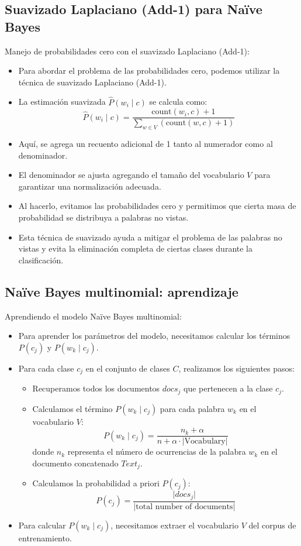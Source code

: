 \subsection{Suavizado Laplaciano (Add-1) para Naïve Bayes}

Manejo de probabilidades cero con el suavizado Laplaciano (Add-1):
\begin{itemize}
    \item Para abordar el problema de las probabilidades cero, podemos utilizar la técnica de suavizado Laplaciano (Add-1).
    \item La estimación suavizada $\hat{P}(w_i \mid c)$ se calcula como:
    \[
    \hat{P}(w_i \mid c) = \frac{\text{count}(w_i, c) + 1}{\sum_{w \in V} (\text{count}(w, c) + 1)}
    \]
    \item Aquí, se agrega un recuento adicional de 1 tanto al numerador como al denominador.
    \item El denominador se ajusta agregando el tamaño del vocabulario $V$ para garantizar una normalización adecuada.
    \item Al hacerlo, evitamos las probabilidades cero y permitimos que cierta masa de probabilidad se distribuya a palabras no vistas.
    \item Esta técnica de suavizado ayuda a mitigar el problema de las palabras no vistas y evita la eliminación completa de ciertas clases durante la clasificación.
\end{itemize}

\subsection{Naïve Bayes multinomial: aprendizaje}

Aprendiendo el modelo Naïve Bayes multinomial:
\begin{itemize}
    \item Para aprender los parámetros del modelo, necesitamos calcular los términos $P(c_j)$ y $P(w_k \mid c_j)$.
    \item Para cada clase $c_j$ en el conjunto de clases $C$, realizamos los siguientes pasos:
    \begin{itemize}
        \item Recuperamos todos los documentos $docs_j$ que pertenecen a la clase $c_j$.
        \item Calculamos el término $P(w_k \mid c_j)$ para cada palabra $w_k$ en el vocabulario $V$:
        \[
        P(w_k \mid c_j) = \frac{{n_k + \alpha}}{{n + \alpha \cdot \lvert \text{Vocabulary} \rvert}}
        \]
        donde $n_k$ representa el número de ocurrencias de la palabra $w_k$ en el documento concatenado $Text_j$.
        \item Calculamos la probabilidad a priori $P(c_j)$:
        \[
        P(c_j) = \frac{{\lvert docs_j \rvert}}{{\lvert \text{total number of documents} \rvert}}
        \]
    \end{itemize}
    \item Para calcular $P(w_k \mid c_j)$, necesitamos extraer el vocabulario $V$ del corpus de entrenamiento.
\end{itemize}

